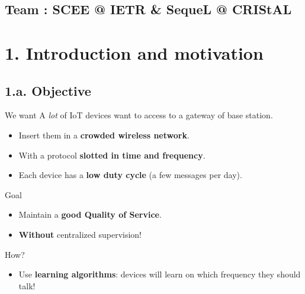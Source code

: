 \documentclass[12pt,english,ignorenonframetext,aspectratio=169,]{beamer}
\providecommand{\tightlist}{%
  \setlength{\itemsep}{0pt}\setlength{\parskip}{0pt}}
\begin{document}
\subsection*{\hfill{}Team {:} SCEE @ IETR \& SequeL @ CRIStAL\hfill{}}




\section{\hfill{}1. Introduction and motivation\hfill{}}

\subsection{\hfill{}1.a. Objective\hfill{}}

\begin{frame}{We want}
A \emph{lot} of IoT devices want to access to a gateway of base station.

\begin{itemize}
\tightlist
\item
  Insert them in a \textbf{crowded wireless network}.
\item
  With a protocol \textbf{slotted in time and frequency}.
\item
  Each device has a \textbf{low duty cycle} (a few messages per day).
\end{itemize}

\pause

\begin{block}{Goal}

\begin{itemize}
\tightlist
\item
  Maintain a \textbf{good Quality of Service}.
\item
  \textbf{Without} centralized supervision!
\end{itemize}

\end{block}

\pause

\begin{block}{How?}

\begin{itemize}
\tightlist
\item
  Use \textbf{learning algorithms}: devices will learn on which
  frequency they should talk!
\end{itemize}

\end{block}

\end{frame}
\end{document}
